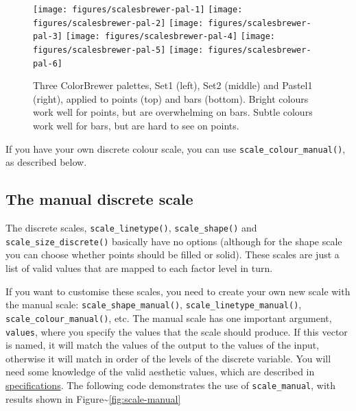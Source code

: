 \begin{figure}
\texttt{[image: figures/scalesbrewer-pal-1]} \texttt{[image: figures/scalesbrewer-pal-2]} \texttt{[image: figures/scalesbrewer-pal-3]} \texttt{[image: figures/scalesbrewer-pal-4]} \texttt{[image: figures/scalesbrewer-pal-5]} \texttt{[image: figures/scalesbrewer-pal-6]} \caption{Three ColorBrewer palettes, Set1 (left), Set2 (middle) and Pastel1 (right), applied to points (top) and bars (bottom). Bright colours work well for points, but are overwhelming on bars. Subtle colours work well for bars, but are hard to see on points.\label{fig:brewer-pal}}
\end{figure}

If you have your own discrete colour scale, you can use
\texttt{scale\_colour\_manual()}, as described below.

\subsection{The manual discrete scale}\label{sub:scale-manual}

The discrete scales, \texttt{scale\_linetype()}, \texttt{scale\_shape()}
and \texttt{scale\_size\_discrete()} basically have no options (although
for the shape scale you can choose whether points should be filled or
solid). These scales are just a list of valid values that are mapped to
each factor level in turn.  

If you want to customise these scales, you need to create your own new
scale with the manual scale: \texttt{scale\_shape\_manual()},
\texttt{scale\_linetype\_manual()}, \texttt{scale\_colour\_manual()},
etc. The manual scale has one important argument, \texttt{values}, where
you specify the values that the scale should produce. If this vector is
named, it will match the values of the output to the values of the
input, otherwise it will match in order of the levels of the discrete
variable. You will need some knowledge of the valid aesthetic values,
which are described in \hyperref[cha:specifications]{specifications}.
The following code demonstrates the use of \texttt{scale\_manual}, with
results shown in Figure\textasciitilde{}\ref{fig:scale-manual}
 

